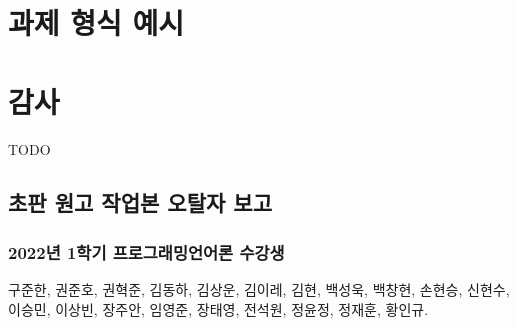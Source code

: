\printbibliography[title=참고문헌]

\AppendixTitleToToc
\AttachAppendixTitleToSecnum

\appendix
\appendixpage*


\section{과제 형식 예시}


\newpage

\section{감사}
TODO

\subsection{초판 원고 작업본 오탈자 보고}
\subsubsection{2022년 1학기 프로그래밍언어론 수강생}
구준한,
권준호,
권혁준,
김동하,
김상운,
김이레,
김현,
백성욱,
백창현,
손현승,
신현수,
이승민,
이상빈,
장주안,
임영준,
장태영,
전석원,
정윤정,
정재훈,
황인규.

\begin{comment}
\newpage

\section{다음 판에 추가할지 고려중인 주제}
\subsection{Control}
Continuation-Passing Style,
Delimited Continuations,
Coroutines, Exceptions, Async-Await,
Algebraic Effects,
Functor/Applicative/Monad/Monoid/...

\url{https://www.microsoft.com/en-us/research/wp-content/uploads/2016/08/algeff-tr-2016-v2.pdf}

\subsection{Staged Computation}
Interpreter vs. Compiler, Futamura Projections, Partial Evaluation

\end{comment}


